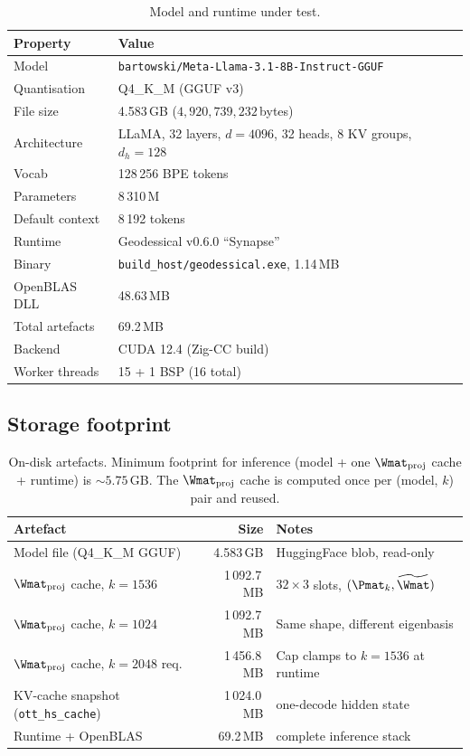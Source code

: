 \documentclass[11pt]{article}
\begin{document}
\begin{table}[h]\centering\footnotesize
\caption{Model and runtime under test.}
\begin{tabular}{@{}ll@{}}
\toprule
\textbf{Property} & \textbf{Value}\\
\midrule
Model               & \texttt{bartowski/Meta-Llama-3.1-8B-Instruct-GGUF}\\
Quantisation        & Q4\_K\_M (GGUF v3)\\
File size           & 4.583\,GB ($4{,}920{,}739{,}232$\,bytes)\\
Architecture        & LLaMA, 32 layers, $d{=}4096$, 32 heads, 8 KV groups, $d_h{=}128$\\
Vocab               & 128\,256 BPE tokens\\
Parameters          & 8\,310\,M\\
Default context     & 8\,192 tokens\\
\midrule
Runtime             & Geodessical v0.6.0 ``Synapse''\\
Binary              & \texttt{build\_host/geodessical.exe}, 1.14\,MB\\
OpenBLAS DLL        & 48.63\,MB\\
Total artefacts     & 69.2\,MB\\
Backend             & CUDA 12.4 (Zig-CC build)\\
Worker threads      & 15 + 1 BSP (16 total)\\
\bottomrule
\end{tabular}
\end{table}

\subsection{Storage footprint}

\begin{table}[h]\centering\footnotesize
\caption{On-disk artefacts. Minimum footprint for inference (model + one
$\Wmat_\text{proj}$ cache + runtime) is ${\sim}5.75$\,GB. The
$\Wmat_\text{proj}$ cache is computed once per (model, $k$) pair and reused.}
\begin{tabular}{@{}lrl@{}}
\toprule
\textbf{Artefact} & \textbf{Size} & \textbf{Notes}\\
\midrule
Model file (Q4\_K\_M GGUF)                  & 4.583\,GB   & HuggingFace blob, read-only\\
$\Wmat_\text{proj}$ cache, $k{=}1536$       & 1\,092.7\,MB & $32{\times}3$ slots, $(\Pmat_k,\widetilde\Wmat)$\\
$\Wmat_\text{proj}$ cache, $k{=}1024$       & 1\,092.7\,MB & Same shape, different eigenbasis\\
$\Wmat_\text{proj}$ cache, $k{=}2048$ req.\ & 1\,456.8\,MB & Cap clamps to $k{=}1536$ at runtime\\
KV-cache snapshot (\texttt{ott\_hs\_cache}) & 1\,024.0\,MB & one-decode hidden state\\
Runtime + OpenBLAS                          & 69.2\,MB     & complete inference stack\\
\bottomrule
\end{tabular}
\end{table}
\end{document}
